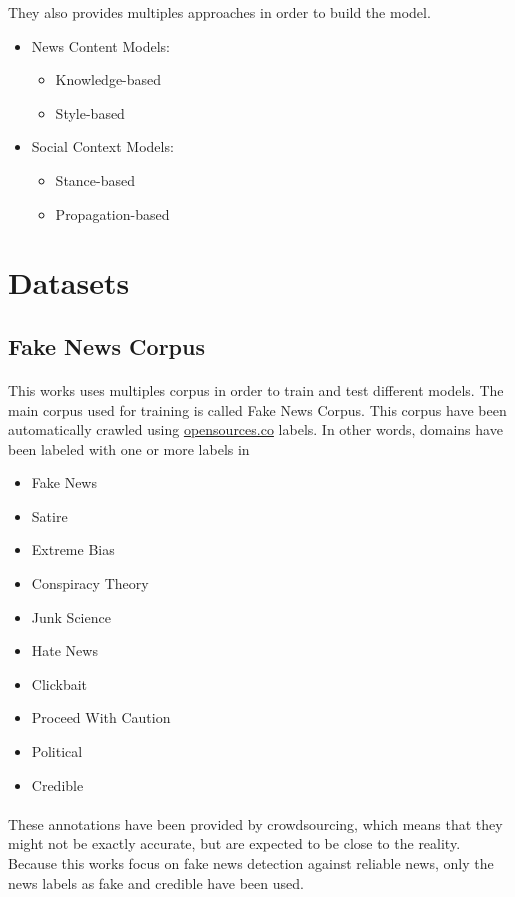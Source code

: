 They also provides multiples approaches in order to build the model. 

\begin{itemize}
	\item News Content Models:
	\begin{itemize}
		\item Knowledge-based
		\item Style-based
	\end{itemize}
	\item Social Context Models:
	\begin{itemize}
		\item Stance-based
		\item Propagation-based
	\end{itemize}
\end{itemize}

\section{Datasets}
\subsection{Fake News Corpus}
\paragraph{}
This works uses multiples corpus in order to train and test different models. The main corpus used for training is called Fake News Corpus\cite{Szpakowski}. This corpus have been automatically crawled using \url{opensources.co} labels. In other words, domains have been labeled with one or more labels in \begin{itemize}
	\item Fake News
	\item Satire
	\item Extreme Bias
	\item Conspiracy Theory
	\item Junk Science
	\item Hate News
	\item Clickbait
	\item Proceed With Caution
	\item Political
	\item Credible
\end{itemize}
\paragraph{}
These annotations have been provided by crowdsourcing, which means that they might not be exactly accurate, but are expected to be close to the reality. Because this works focus on fake news detection against reliable news, only the news labels as fake and credible have been used. 

